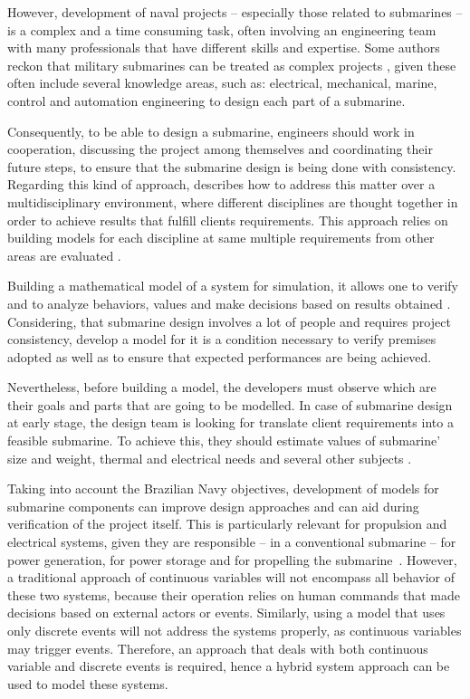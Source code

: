 \documentclass[10pt,fleqn,a4paper,twoside]{article}
\begin{document}
	However, development of naval projects -- especially those related to submarines -- is a complex and a time consuming task, often involving an engineering team with many professionals that have different skills and expertise. Some authors reckon that military submarines can be treated as complex projects \citep{Chalfant2015} \citep{Cooper2017}, given these often include several knowledge areas, such as: electrical, mechanical, marine, control and automation engineering to design each part of a submarine.

	Consequently, to be able to design a submarine, engineers should work in cooperation, discussing the project among themselves and coordinating their future steps, to ensure that the submarine design is being done with consistency. Regarding this kind of approach, \citet{Langland2015} describes how to address this matter over a multidisciplinary environment, where different disciplines are thought together in order to achieve results that fulfill clients requirements. This approach relies on building models for each discipline at same multiple requirements from other areas are evaluated \citet{Chalfant2017b}.

	Building a mathematical model of a system for simulation, it allows one to verify and to analyze behaviors, values and make decisions based on results obtained \citep{Chung2004}. Considering, that submarine design involves a lot of people and requires project consistency, develop a model for it is a condition necessary to verify premises adopted as well as to ensure that expected performances are being achieved.

	Nevertheless, before building a model, the developers must observe which are their goals and parts that are going to be modelled. In case of submarine design at early stage, the design team is looking for translate client requirements into a feasible submarine. To achieve this, they should estimate values of submarine' size and weight, thermal and electrical needs and several other subjects \citet{Pereira2016}.

	Taking into account the Brazilian Navy objectives, development of models for submarine components can improve design approaches and can aid during verification of the project itself. This is particularly relevant for propulsion and electrical systems, given they are responsible -- in a conventional submarine -- for power generation, for power storage and for propelling the submarine~\citet{Pereira2016}. However, a traditional approach of continuous variables will not encompass all behavior of these two systems, because their operation relies on human commands that made decisions based on external actors or events. Similarly, using a model that uses only discrete events will not address the systems properly, as continuous variables may trigger events. Therefore, an approach that deals with both continuous variable and discrete events is required, hence a hybrid system approach can be used to model these systems.
\end{document}
